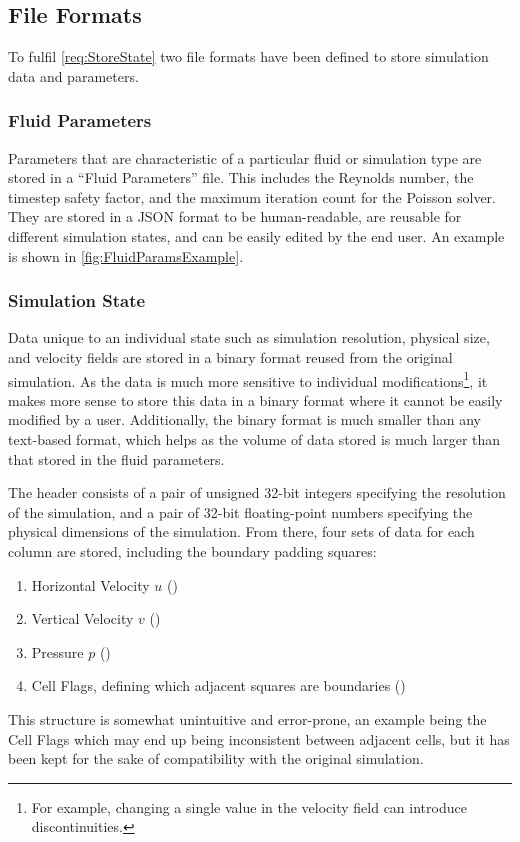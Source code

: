 \subsection{File Formats}\label{sec:FileFormat}
To fulfil \cref{req:StoreState} two file formats have been defined to store simulation data and parameters.

\subsubsection{Fluid Parameters}
Parameters that are characteristic of a particular fluid or simulation type are stored in a ``Fluid Parameters'' file.
This includes the Reynolds number, the timestep safety factor, and the maximum iteration count for the Poisson solver.
They are stored in a JSON format to be human-readable, are reusable for different simulation states, and can be easily edited by the end user.
An example is shown in \cref{fig:FluidParamsExample}.



\subsubsection{Simulation State}
Data unique to an individual state such as simulation resolution, physical size, and velocity fields are stored in a binary format reused from the original simulation.
As the data is much more sensitive to individual modifications\footnote{For example, changing a single value in the velocity field can introduce discontinuities.}, it makes more sense to store this data in a binary format where it cannot be easily modified by a user.
Additionally, the binary format is much smaller than any text-based format, which helps as the volume of data stored is much larger than that stored in the fluid parameters.

The header consists of a pair of unsigned 32-bit integers specifying the resolution of the simulation, and a pair of 32-bit floating-point numbers specifying the physical dimensions of the simulation.
From there, four sets of data for each column are stored, including the boundary padding squares:
\begin{enumerate}
    \item Horizontal Velocity $u$ ()
    \item Vertical Velocity $v$ ()
    \item Pressure $p$ ()
    \item Cell Flags, defining which adjacent squares are boundaries ()
\end{enumerate}
This structure is somewhat unintuitive and error-prone, an example being the Cell Flags which may end up being inconsistent between adjacent cells, but it has been kept for the sake of compatibility with the original simulation.
